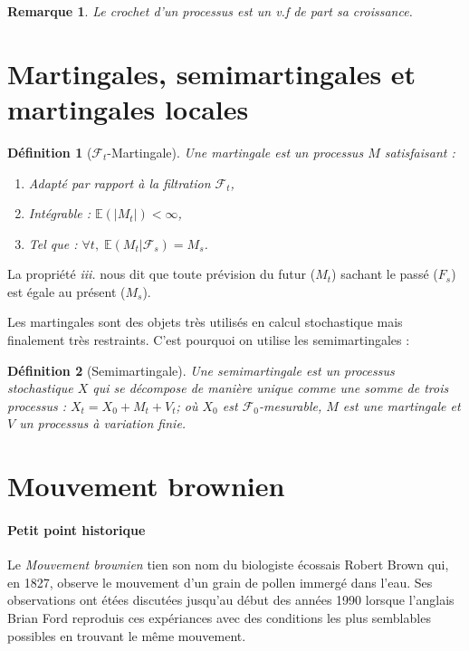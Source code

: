 \documentclass[openany]{book}
\newcommand{\F}{\mathscr{F}}
\newcommand{\E}{\mathbb{E}}
\newcommand{\1}{\mathbbm{1}}
\theoremstyle{thmfont}
\theoremstyle{deffont}
\newtheorem{definition}[definition]{Définition}
\theoremstyle{thmfont}
\theoremstyle{deffont}
\newtheorem*{remark}{Remarque}
\begin{document}
\begin{remark}
  Le crochet d'un processus est un v.f de part sa croissance.
\end{remark}

\section{Martingales, semimartingales et martingales locales}

\begin{definition}[$\F_t$-Martingale]
  Une \textit{martingale} est un processus $M$ satisfaisant :
  \begin{enumerate}[nosep]
    \item Adapté par rapport à la filtration $\F_t$,
    \item Intégrable : $\E(|M_t|) < \infty$,
    \item Tel que : $\forall t, \; \E(M_t|\F_s) = M_s$.
  \end{enumerate}
\end{definition}

La propriété \textit{iii.} nous dit que toute prévision du futur ($M_t$) sachant le passé ($F_s$) est égale au présent ($M_s$).

Les martingales sont des objets très utilisés en calcul stochastique mais finalement très restraints. C'est pourquoi on utilise les semimartingales :

\begin{definition}[Semimartingale] Une \textit{semimartingale} est un processus stochastique $X$ qui se décompose de manière unique comme une somme de trois processus : $X_t = X_0+ M_t + V_t$; où $X_0$ est $\F_0$-mesurable, $M$ est une martingale et $V$ un processus à variation finie.
\end{definition}

\section{Mouvement brownien}
\paragraph{Petit point historique}
Le \textit{Mouvement brownien} tien son nom du biologiste écossais Robert Brown qui, en 1827, observe le mouvement d'un grain de pollen immergé dans l'eau. Ses observations ont étées discutées jusqu'au début des années 1990 {\color{red}lorsque l'anglais Brian Ford reproduis ces expériances avec des conditions les plus semblables possibles en trouvant le même mouvement.}
\end{document}
